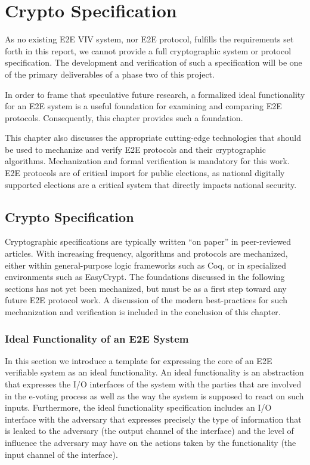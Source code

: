 \chapter{Crypto Specification}
\label{chapter:crypto_spec}

As no existing E2E VIV system, nor E2E protocol, fulfills the
requirements set forth in this report, we cannot provide a full
cryptographic system or protocol specification.  The development and
verification of such a specification will be one of the primary
deliverables of a phase two of this project.

In order to frame that speculative future research, a formalized ideal
functionality for an E2E system is a useful foundation for examining
and comparing E2E protocols. Consequently, this chapter provides such
a foundation.  

This chapter also discusses the appropriate cutting-edge technologies
that should be used to mechanize and verify E2E protocols and their
cryptographic algorithms. Mechanization and formal verification is
mandatory for this work. E2E protocols are of critical import for
public elections, as national digitally supported elections are a
critical system that directly impacts national security.

\section{Crypto Specification}

Cryptographic specifications are typically written ``on paper'' in
peer-reviewed articles. With increasing frequency, algorithms and
protocols are mechanized, either within general-purpose logic
frameworks such as Coq, or in specialized environments such as
EasyCrypt. The foundations discussed in the following sections has not
yet been mechanized, but must be as a first step toward any future E2E
protocol work. A discussion of the modern best-practices for such
mechanization and verification is included in the conclusion of this
chapter.

\subsection{Ideal Functionality of an E2E System}

In this section we introduce a template for expressing the core of an
E2E verifiable system as an ideal functionality. An ideal
functionality is an abstraction that expresses the I/O interfaces of
the system with the parties that are involved in the e-voting process
as well as the way the system is supposed to react on such
inputs. Furthermore, the ideal functionality specification includes an
I/O interface with the adversary that expresses precisely the type of
information that is leaked to the adversary (the output channel of the
interface) and the level of influence the adversary may have on the
actions taken by the functionality (the input channel of the
interface).

